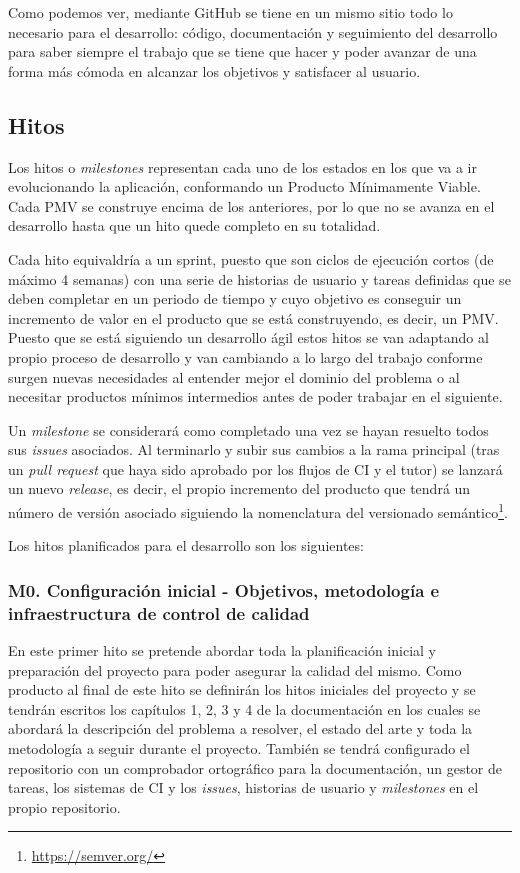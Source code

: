 Como podemos ver, mediante GitHub se tiene en un mismo sitio todo lo necesario
para el desarrollo: código, documentación y seguimiento del desarrollo para
saber siempre el trabajo que se tiene que hacer y poder avanzar de una forma más
cómoda en alcanzar los objetivos y satisfacer al usuario. 

\subsection{Hitos}
Los hitos o \textit{milestones} representan cada uno de los estados en los que
va a ir evolucionando la aplicación, conformando un Producto Mínimamente Viable.
Cada PMV se construye encima de los anteriores, por lo que no se avanza en el
desarrollo hasta que un hito quede completo en su totalidad. 

Cada hito equivaldría a un sprint, puesto que son ciclos de ejecución cortos (de
máximo 4 semanas) con una serie de historias de usuario y tareas definidas que
se deben completar en un periodo de tiempo y cuyo objetivo es conseguir un
incremento de valor en el producto que se está construyendo, es decir, un PMV.
Puesto que se está siguiendo un desarrollo ágil estos hitos se van adaptando al
propio proceso de desarrollo y van cambiando a lo largo del trabajo conforme
surgen nuevas necesidades al entender mejor el dominio del problema o al
necesitar productos mínimos intermedios antes de poder trabajar en el siguiente.

Un \textit{milestone} se considerará como completado una vez se hayan resuelto
todos sus \textit{issues} asociados. Al terminarlo y subir sus cambios a la rama
principal (tras un \textit{pull request} que haya sido aprobado por los flujos
de CI y el tutor) se lanzará un nuevo \textit{release}, es decir, el propio
incremento del producto que tendrá un número de versión asociado siguiendo la
nomenclatura del versionado semántico\footnote{\url{https://semver.org/}}.

Los hitos planificados para el desarrollo son los siguientes:

\subsubsection{M0. Configuración inicial - Objetivos, metodología e infraestructura de control de calidad}
En este primer hito se pretende abordar toda la planificación inicial y
preparación del proyecto para poder asegurar la calidad del mismo. Como producto
al final de este hito se definirán los hitos iniciales del proyecto y se tendrán
escritos los capítulos 1, 2, 3 y 4 de la documentación en los cuales se abordará
la descripción del problema a resolver, el estado del arte y toda la metodología
a seguir durante el proyecto. También se tendrá configurado el repositorio con
un comprobador ortográfico para la documentación, un gestor de tareas, los
sistemas de CI y los \textit{issues}, historias de usuario y \textit{milestones}
en el propio repositorio.

